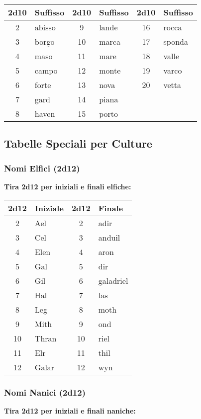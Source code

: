 \begin{multicols}{2}
{\noindent\begin{tabular}{c|l|c|l|c|l}
\toprule
	\textbf{2d10} & \textbf{Suffisso} & \textbf{2d10} & \textbf{Suffisso} & \textbf{2d10} & \textbf{Suffisso} \\
\toprule
	2 & abisso & 9 & lande & 16 & rocca \\
	3 & borgo & 10 & marca & 17 & sponda \\
	4 & maso & 11 & mare & 18 & valle \\
	5 & campo & 12 & monte & 19 & varco \\
	6 & forte & 13 & nova & 20 & vetta \\
	7 & gard & 14 & piana & & \\
	8 & haven & 15 & porto & & \\

\end{tabular}



\subsection*{Tabelle Speciali per Culture}

\subsubsection*{Nomi Elfici (2d12)}
\textbf{Tira 2d12 per iniziali e finali elfiche:}

\noindent\begin{tabular}{c|l|c|l}
	\toprule
\textbf{2d12} & \textbf{Iniziale} & \textbf{2d12} & \textbf{Finale} \\
\toprule
2 & Ael & 2 & adir \\
3 & Cel & 3 & anduil \\
4 & Elen & 4 & aron \\
5 & Gal & 5 & dir \\
6 & Gil & 6 & galadriel \\
7 & Hal & 7 & las \\
8 & Leg & 8 & moth \\
9 & Mith & 9 & ond \\
10 & Thran & 10 & riel \\
11 & Elr & 11 & thil \\
12 & Galar & 12 & wyn \\

\end{tabular}


\subsubsection*{Nomi Nanici (2d12)}
\textbf{Tira 2d12 per iniziali e finali naniche:}

}
\end{multicols}
